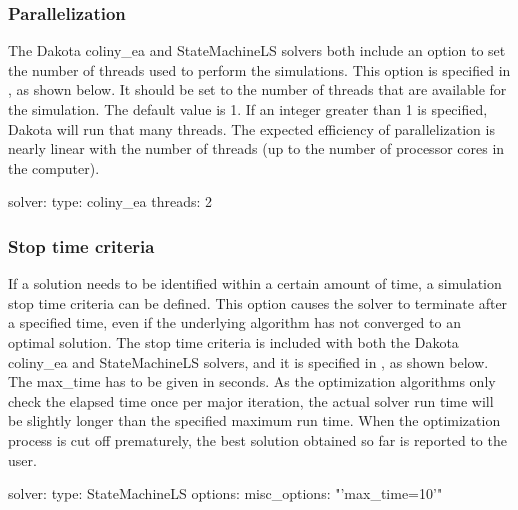 \subsubsection{Parallelization}

The Dakota coliny\_ea and StateMachineLS solvers both include an option to set 
the number of threads used to perform the simulations.   
This option is specified in \code{[solver][threads]}, as shown below. It should be 
set to the number of threads that are available for the simulation. The default value is 1.  
If an integer greater than 1 is specified, Dakota will run that many threads.
The expected efficiency of parallelization is nearly linear with the number of 
threads (up to the number of processor cores in the computer).

\begin{unknownListing}
solver:
  type: coliny_ea 
  threads: 2
\end{unknownListing}

\subsubsection{Stop time criteria}

If a solution needs to be identified within a certain amount of time, a simulation stop time 
criteria can be defined. This option causes the solver to terminate after a 
specified time, even if the underlying algorithm has not converged to an optimal solution.  
The stop time criteria is included with both the Dakota coliny\_ea and 
StateMachineLS solvers, and it is specified in , as 
shown below. The max\_time has to be given in seconds. As the optimization 
algorithms only check the elapsed time once per major iteration, the actual 
solver run time will be slightly longer than the specified maximum run time.  
When the optimization process is cut off prematurely, the best solution 
obtained so far is reported to the user.

\begin{unknownListing}
solver:
  type: StateMachineLS  
  options: 
    misc_options: "'max_time=10'"
\end{unknownListing}


